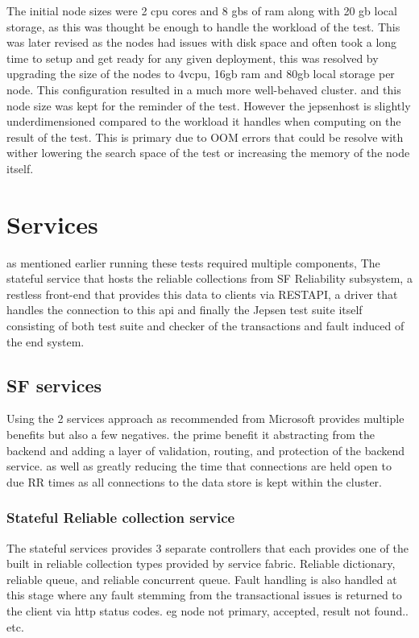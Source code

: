 \documentclass[a4paper,10pt,titlepage]{report}
\begin{document}
The initial node sizes were 2 cpu cores and 8 gbs of ram along with 20 gb local storage, as this was thought be enough to handle the workload of the test. This was later revised as the nodes had issues with disk space and often took a long time to setup and get ready for any given deployment, this was resolved by upgrading the size of the nodes to 4vcpu, 16gb ram and 80gb local storage per node. This configuration resulted in a much more well-behaved cluster. and this node size was kept for the reminder of the test. However the jepsenhost is slightly underdimensioned compared to the workload it handles when computing on the result of the test. This is primary due to OOM errors that could be resolve with wither lowering the search space of the test or increasing the memory of the node itself.

\section{Services}
as mentioned earlier running these tests required multiple components, The stateful service that hosts the reliable collections from SF Reliability subsystem, a restless front-end that provides this data to clients via RESTAPI, a driver that handles the connection to this api and finally the Jepsen test suite itself consisting of both test suite and checker of the transactions and fault induced of the end system.

\subsection{SF services}
Using the 2 services approach as recommended from Microsoft provides multiple benefits but also a few negatives. the prime benefit it abstracting from the backend and adding a layer of validation, routing, and protection of the backend service. as well as greatly reducing the time that connections are held open to due RR times as all connections to the data store is kept within the cluster. 
\subsubsection{Stateful Reliable collection service}

The stateful services provides 3 separate controllers that each provides one of the built in reliable collection types provided by service fabric. Reliable dictionary, reliable queue, and reliable concurrent queue. Fault handling is also handled at this stage where any fault stemming from the transactional issues is returned to the client via http status codes\cite{https://en.wikipedia.org/wiki/List_of_HTTP_status_codes}. eg node not primary, accepted, result not found.. etc. 
\end{document}

